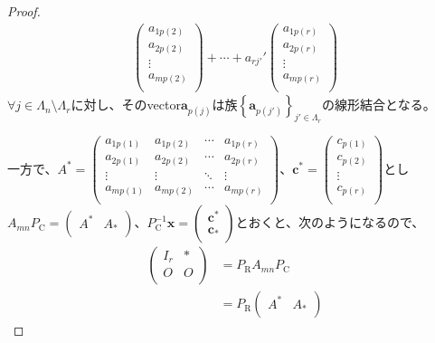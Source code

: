 \documentclass[dvipdfmx]{jsarticle}
\begin{document}
\begin{proof}
\begin{align*}
\begin{pmatrix}
a_{1p(2)} \\
a_{2p(2)} \\
 \vdots \\
a_{mp(2)} \\
\end{pmatrix} + \cdots + a_{rj'}'\begin{pmatrix}
a_{1p(r)} \\
a_{2p(r)} \\
 \vdots \\
a_{mp(r)} \\
\end{pmatrix}
\end{align*}
$\forall j \in \varLambda_{n} \setminus \varLambda_{r}$に対し、そのvector$\mathbf{a}_{p(j)}$は族$\left\{ \mathbf{a}_{p\left( j'\right) } \right\}_{j' \in \varLambda_{r} } $の線形結合となる。\par
一方で、$A^{*} = \begin{pmatrix}
a_{1p(1)} & a_{1p(2)} & \cdots & a_{1p(r)} \\
a_{2p(1)} & a_{2p(2)} & \cdots & a_{2p(r)} \\
 \vdots & \vdots & \ddots & \vdots \\
a_{mp(1)} & a_{mp(2)} & \cdots & a_{mp(r)} \\
\end{pmatrix}$、$\mathbf{c}^{*} = \begin{pmatrix}
c_{p(1)} \\
c_{p(2)} \\
 \vdots \\
c_{p(r)} \\
\end{pmatrix}$とし$A_{mn}P_{\mathrm{C}} = \begin{pmatrix}
A^{*} & A_{*} \\
\end{pmatrix}$、$P_{\mathrm{C}}^{- 1}\mathbf{x} = \begin{pmatrix}
\mathbf{c}^{*} \\
\mathbf{c}_{*} \\
\end{pmatrix}$とおくと、次のようになるので、
\begin{align*}
\begin{pmatrix}
I_{r} & * \\
O & O \\
\end{pmatrix} &= P_{\mathrm{R}}A_{mn}P_{\mathrm{C}}\\
&= P_{\mathrm{R}}\begin{pmatrix}
A^{*} & A_{*} \\

\end{pmatrix}
\end{align*}
\end{proof}
\end{document}
